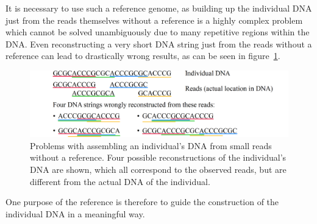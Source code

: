 \documentclass[a4paper,12pt,twoside,BCOR=10mm]{scrbook}
\begin{document}
It is necessary to use such a reference genome, as 
building up the individual DNA just from the reads themselves without a reference is a highly complex problem 
which cannot be solved unambiguously due to many repetitive regions within the DNA. 
Even reconstructing a very short DNA string just from the reads without a reference can lead to drastically wrong 
results, as can be seen in figure~\ref{fig:evo_intro_assembly_wo_reference}. 
\begin{figure}[!htb]
\centering
\includegraphics[width=\textwidth]{evo_intro_assembly_wo_reference.png}
\caption[Assembling an individual's DNA from small reads without a reference]{Problems with assembling an individual's DNA from small reads without a reference. Four possible reconstructions of the individual's DNA are shown, which all correspond to the observed reads, but are different from the actual DNA of the individual.} \label{fig:evo_intro_assembly_wo_reference}
\end{figure}
One purpose of the reference is therefore to guide the construction of the individual DNA in a meaningful way.
\end{document}
